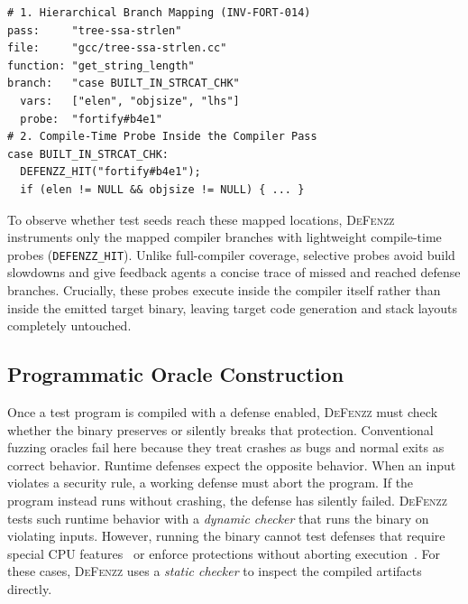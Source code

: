 \documentclass[conference,compsoc]{IEEEtran}
\begin{document}
\par\vspace{5pt}\noindent\begin{minipage}{\columnwidth}
\begin{lstlisting}[language={}, keepspaces=true, morekeywords={pass,file,function,branch,vars,probe,case,if,DEFENZZ_HIT}, morecomment={[f]{\#}}, morestring={[b]"}, numbers=none, xleftmargin=3pt, framexleftmargin=0pt, caption={Hierarchical branch mapping and compile-time probe for \texttt{INV-FORT-014}.}, label={lst:source-mapping}]
# 1. Hierarchical Branch Mapping (INV-FORT-014)
pass:     "tree-ssa-strlen"
file:     "gcc/tree-ssa-strlen.cc"
function: "get_string_length"
branch:   "case BUILT_IN_STRCAT_CHK"
  vars:   ["elen", "objsize", "lhs"]
  probe:  "fortify#b4e1"
# 2. Compile-Time Probe Inside the Compiler Pass
case BUILT_IN_STRCAT_CHK:
  DEFENZZ_HIT("fortify#b4e1");
  if (elen != NULL && objsize != NULL) { ... }
\end{lstlisting}
\end{minipage}\par\vspace{5pt}

To observe whether test seeds reach these mapped locations, \textsc{DeFenzz} instruments only the mapped compiler branches with lightweight compile-time probes (\texttt{DEFENZZ\_HIT}). Unlike full-compiler coverage, selective probes avoid build slowdowns and give feedback agents a concise trace of missed and reached defense branches. Crucially, these probes execute inside the compiler itself rather than inside the emitted target binary, leaving target code generation and stack layouts completely untouched.

\subsection{Programmatic Oracle Construction}\label{sec:oracle}

Once a test program is compiled with a defense enabled, \textsc{DeFenzz} must check whether the binary preserves or silently breaks that protection. Conventional fuzzing oracles fail here because they treat crashes as bugs and normal exits as correct behavior. Runtime defenses expect the opposite behavior. When an input violates a security rule, a working defense must abort the program. If the program instead runs without crashing, the defense has silently failed. \textsc{DeFenzz} tests such runtime behavior with a \emph{dynamic checker} that runs the binary on violating inputs. However, running the binary cannot test defenses that require special CPU features~\cite{burow2019shadowstacks,serebryany2018memorytagging} or enforce protections without aborting execution~\cite{yang2017deadstore,vassena2021blade}. For these cases, \textsc{DeFenzz} uses a \emph{static checker} to inspect the compiled artifacts directly.
\end{document}
